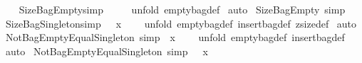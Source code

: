 \begin{isabellebody}
\ \ \isanewline
{}\isamarkupfalse%
\ SizeBagEmpty{\isacharbrackleft}simp{\isacharbrackright}{\isacharcolon}\ {\isachardoublequoteopen}{\isacharhash}\ {\isacharpercent}{\isacharbrackleft}{\isacharpercent}{\isacharbrackright}\ {\isacharequal}\ {}{\isachardoublequoteclose}\isanewline
%
\isadelimproof
%
\endisadelimproof
%
\isatagproof
{}\isamarkupfalse%
\ {\isacharparenleft}unfold\ emptybag{\isacharunderscore}def{\isacharparenright}\isanewline
{}\isamarkupfalse%
\ auto\isanewline
{}\isamarkupfalse%
%
\endisatagproof
{\isafoldproof}%
%
\isadelimproof
\isanewline
%
\endisadelimproof
{}\isamarkupfalse%
\ SizeBagEmpty\ {\isacharbrackleft}simp{\isacharbrackright}\isanewline
\isanewline
{}\isamarkupfalse%
\ SizeBagSingleton{\isacharbrackleft}simp{\isacharbrackright}{\isacharcolon}\ {\isachardoublequoteopen}{\isacharhash}\ {\isacharpercent}{\isacharbrackleft}\ x\ {\isacharpercent}{\isacharbrackright}\ {\isacharequal}\ {}{\isachardoublequoteclose}\isanewline
%
\isadelimproof
%
\endisadelimproof
%
\isatagproof
{}\isamarkupfalse%
\ {\isacharparenleft}unfold\ emptybag{\isacharunderscore}def\ insertbag{\isacharunderscore}def\ zsize{\isacharunderscore}def{\isacharparenright}\isanewline
{}\isamarkupfalse%
\ auto\isanewline
{}\isamarkupfalse%
%
\endisatagproof
{\isafoldproof}%
%
\isadelimproof
\isanewline
%
\endisadelimproof
\isanewline
{}\isamarkupfalse%
\ NotBagEmptyEqualSingleton\ {\isacharbrackleft}simp{\isacharbrackright}{\isacharcolon}\ {\isachardoublequoteopen}\ {\isacharpercent}{\isacharbrackleft}x\ {\isacharpercent}{\isacharbrackright}\ {\isachartilde}{\isacharequal}\ {\isacharpercent}{\isacharbrackleft}{\isacharpercent}{\isacharbrackright}{\isachardoublequoteclose}\isanewline
%
\isadelimproof
%
\endisadelimproof
%
\isatagproof
{}\isamarkupfalse%
\ {\isacharparenleft}unfold\ emptybag{\isacharunderscore}def\ insertbag{\isacharunderscore}def{\isacharparenright}\isanewline
{}\isamarkupfalse%
\ auto\isanewline
{}\isamarkupfalse%
%
\endisatagproof
{\isafoldproof}%
%
\isadelimproof
\isanewline
%
\endisadelimproof
\isanewline
{}\isamarkupfalse%
\ NotBagEmptyEqualSingleton{}\ {\isacharbrackleft}simp{\isacharbrackright}{\isacharcolon}\ {\isachardoublequoteopen}{\isacharpercent}{\isacharbrackleft}{\isacharpercent}{\isacharbrackright}\ {\isachartilde}{\isacharequal}\ {\isacharparenleft}{\isacharpercent}{\isacharbrackleft}x\ {\isacharpercent}{\isacharbrackright}{\isacharparenright}{\isachardoublequoteclose}\isanewline

\end{isabellebody}
